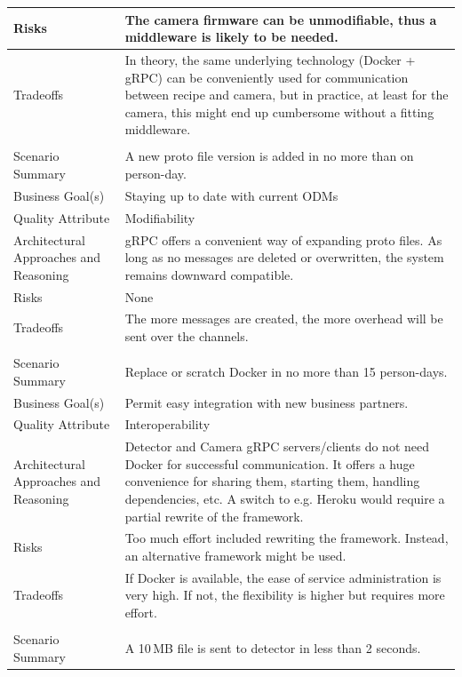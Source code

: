 {\begin{longtable}{| P{0.2\textwidth} | P{0.74\textwidth} |}
Risks &  The camera firmware can be unmodifiable, thus a middleware is likely to be needed. \\ \hline
Tradeoffs & In theory, the same underlying technology (Docker + gRPC) can be conveniently used for communication between recipe and camera, but in practice, at least for the camera, this might end up cumbersome without a fitting middleware. \\ \hline
{}
 \\ \hline
Scenario Summary & A new proto file version is added in no more than on person-day.\\ \hline
Business Goal(s) & Staying up to date with current ODMs\\ \hline
Quality Attribute & Modifiability\\ \hline
Architectural Approaches and Reasoning & gRPC offers a convenient way of expanding proto files. As long as no messages are deleted or overwritten, the system remains downward compatible.\\ \hline
Risks &  None\\ \hline
Tradeoffs &  The more messages are created, the more overhead will be sent over the channels.\\ \hline
{}
 \\ \hline
Scenario Summary & Replace or scratch Docker in no more than 15 person-days.\\ \hline
Business Goal(s) & Permit easy integration with new business partners. \\ \hline
Quality Attribute & Interoperability\\ \hline
Architectural Approaches and Reasoning & Detector and Camera gRPC servers/clients do not need Docker for successful communication. It offers a huge convenience for sharing them, starting them, handling dependencies, etc. A switch to e.g. Heroku would require a partial rewrite of the framework.\\ \hline
Risks &  Too much effort included rewriting the framework. Instead, an alternative framework might be used.\\ \hline
Tradeoffs & If Docker is available, the ease of service administration is very high. If not, the flexibility is higher but requires more effort.\\ \hline
{}
 \\ \hline
Scenario Summary & A 10\,MB file is sent to detector in less than 2 seconds. \\ \hline

\end{longtable}}
